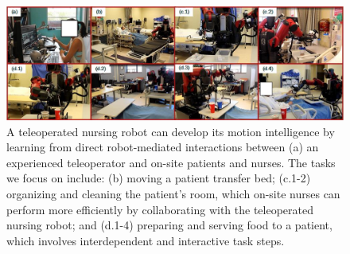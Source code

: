 \documentclass[letterpaper, 11 pt, onecolumn]{article}
\begin{document}

\begin{figure}
\centering
\vspace{0.8ex}
\includegraphics[width=0.99\linewidth]{fig//DemoTasks}
\caption{A teleoperated nursing robot can develop its motion intelligence by learning from direct robot-mediated interactions between (a) an experienced teleoperator and on-site patients and nurses. The tasks we focus on include: (b) moving a patient transfer bed; (c.1-2) organizing and cleaning the patient's room, which on-site nurses can perform more efficiently by collaborating with the teleoperated nursing robot; and (d.1-4) preparing and serving food to a patient, which involves interdependent and interactive task steps.}
\label{Tasks}
\vspace{1.4ex}
\end{figure}
\end{document}
